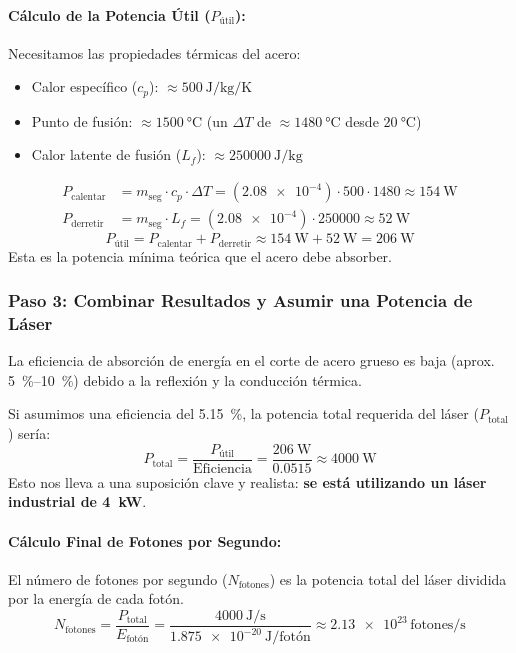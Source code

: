 \documentclass[11pt,a4paper]{article}
\begin{document}
\begin{enumerate}
\paragraph{Cálculo de la Potencia Útil ($P_{\text{útil}}$):}
Necesitamos las propiedades térmicas del acero:
\begin{itemize}
    \item Calor específico ($c_p$): $\approx \SI{500}{\joule\per\kilo\gram\per\kelvin}$
    \item Punto de fusión: $\approx \SI{1500}{\celsius}$ (un $\Delta T$ de $\approx \SI{1480}{\celsius}$ desde $\SI{20}{\celsius}$)
    \item Calor latente de fusión ($L_f$): $\approx \SI{250000}{\joule\per\kilo\gram}$
\end{itemize}
\begin{align*}
    P_{\text{calentar}} &= m_{\text{seg}} \cdot c_p \cdot \Delta T = (\SI{2.08e-4}) \cdot 500 \cdot 1480 \approx \SI{154}{\watt} \\
    P_{\text{derretir}} &= m_{\text{seg}} \cdot L_f = (\SI{2.08e-4}) \cdot 250000 \approx \SI{52}{\watt}
\end{align*}
\[ P_{\text{útil}} = P_{\text{calentar}} + P_{\text{derretir}} \approx \SI{154}{\watt} + \SI{52}{\watt} = \SI{206}{\watt} \]
Esta es la potencia mínima teórica que el acero debe absorber.

\subsubsection*{Paso 3: Combinar Resultados y Asumir una Potencia de Láser}
La eficiencia de absorción de energía en el corte de acero grueso es baja (aprox. \SIrange{5}{10}{\percent}) debido a la reflexión y la conducción térmica.

Si asumimos una eficiencia del \SI{5.15}{\percent}, la potencia total requerida del láser ($P_{\text{total}}$) sería:
\[ P_{\text{total}} = \frac{P_{\text{útil}}}{\text{Eficiencia}} = \frac{\SI{206}{\watt}}{0.0515} \approx \SI{4000}{\watt} \]
Esto nos lleva a una suposición clave y realista: \textbf{se está utilizando un láser industrial de \SI{4}{kW}}.

\paragraph{Cálculo Final de Fotones por Segundo:}
El número de fotones por segundo ($N_{\text{fotones}}$) es la potencia total del láser dividida por la energía de cada fotón.
\[ N_{\text{fotones}} = \frac{P_{\text{total}}}{E_{\text{fotón}}} = \frac{\SI{4000}{\joule\per\second}}{\SI{1.875e-20}{\joule\per\text{fotón}}} \approx \num{2.13e23} \, \text{fotones/s} \]


\end{enumerate}
\end{document}

